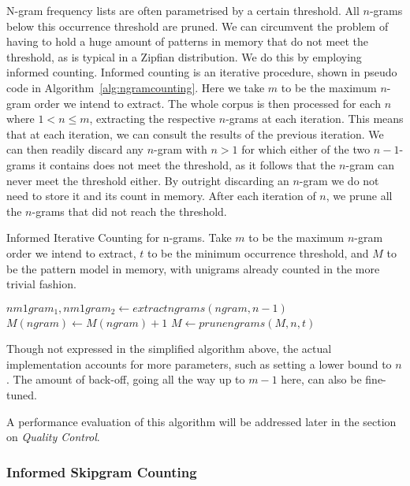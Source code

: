 \documentclass[a4paper,12pt]{article}
\begin{document}
N-gram frequency lists are often parametrised by a certain threshold. All
$n$-grams below this occurrence threshold are pruned. We can circumvent the
problem of having to hold a huge amount of patterns in memory that do not meet
the threshold, as is typical in a Zipfian distribution. We do this by employing
informed counting. Informed counting is an iterative procedure, shown in pseudo
code in Algorithm~\ref{alg:ngramcounting}. Here we take $m$ to be the maximum
$n$-gram order we intend to extract. The whole corpus is then processed for
each $n$ where $1<n\leq m$, extracting the respective $n$-grams at each
iteration. This means that at each iteration, we can consult the results of the
previous iteration. We can then readily discard any $n$-gram with $n>1$ for
which either of the two $n-1$-grams it contains does not
meet the threshold, as it follows that the $n$-gram can never meet the
threshold either. By outright discarding an $n$-gram we do not need to store it
and its count in memory. After each iteration of $n$, we prune all the
$n$-grams that did not reach the threshold.


\begin{algorithm} \caption{Informed Iterative Counting for n-grams.  Take $m$
to be the maximum $n$-gram order we intend to extract, $t$ to be the minimum occurrence threshold, and $M$ to be the
pattern model in memory, with unigrams already counted in the more trivial fashion.}
\label{alg:ngramcounting}
\begin{algorithmic}
            \State  $nm1gram_1, nm1gram_2 \leftarrow extractngrams(ngram,n-1)$
                \State $M(ngram) \leftarrow M(ngram) + 1$
            \EndIf
        \EndFor 
    \EndFor
    \State $M \leftarrow prunengrams(M,n,t)$
\EndFor \\
\end{algorithmic}
\end{algorithm}

Though not expressed in the simplified algorithm above, the actual
implementation accounts for more parameters, such as setting a lower bound to
$n$. The amount of back-off, going all the way up to $m-1$ here, can also be
fine-tuned.

A performance evaluation of this algorithm will be addressed later in the
section on \emph{Quality Control}.

\subsubsection{Informed Skipgram Counting}
\label{sec:skipgramcount}
\end{document}
